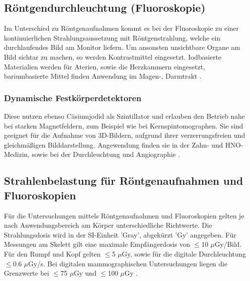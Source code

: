 
\subsection{Röntgendurchleuchtung (Fluoroskopie)}
\label{sec:Fluoroskopie}
Im Unterschied zu Röntgenaufnahmen kommt es bei der Fluoroskopie zu einer kontinuierlichen Strahlungsaussetzung mit Röntgenstrahlung,
 welche ein durchlaufendes Bild am Monitor liefern. Um ansonsten unsichtbare Organe am Bild sichtar zu machen, so werden Kontrastmittel eingesetzt.
Iodbasierte Materialien werden für Aterien, sowie die Herzkammern eingesetzt, bariumbasierte Mittel finden Anwendung im Magen-, Darmtrakt
\cite{Artikel2}.




\subsubsection{Dynamische Festkörperdetektoren}
\label{subsubsec:Festkörperdetektoren}
Diese nutzen ebenso Cäsiumjodid als Szintillator und erlauben den Betrieb nahe bei starken Magnetfeldern, zum Beispiel
wie bei Kernspintomographen. Sie sind geeignet für die Aufnahme von 3D-Bildern, aufgrund ihrer verzerrungsfreien und gleichmäßigen
Bilddarstellung. Angewendung finden sie in der Zahn- und HNO-Medizin, sowie bei der Durchleuchtung und Angiographie 
\cite{MedizinischePhysik}.



\subsection{Strahlenbelastung für Röntgenaufnahmen und Fluoroskopien}
\label{subsec:Strahlenbelastung}

Für die Untersuchungen mittels Röntgenaufnahmen und Fluoroskopien gelten je nach Anwendungsbereich am Körper unterschiedliche 
Richtwerte. Die Strahlungsdosis wird in der SI-Einheit 'Gray', abgekürzt 'Gy' angegeben. Für Messungen am Skelett gilt eine maximale
Empfängerdosis von $\leq$10 $\mu$Gy/Bild. Für den Rumpf und Kopf gelten $\leq$5 $\mu$Gy, sowie für die digitale Durchleuchtung $\leq$0.6 
 $\mu$Gy/s. Bei digitalen mammographischen Untersuchungen liegen die Grenzwerte bei $\leq$75 $\mu$Gy und $\leq$100 $\mu$Gy \cite{Artikel}.




